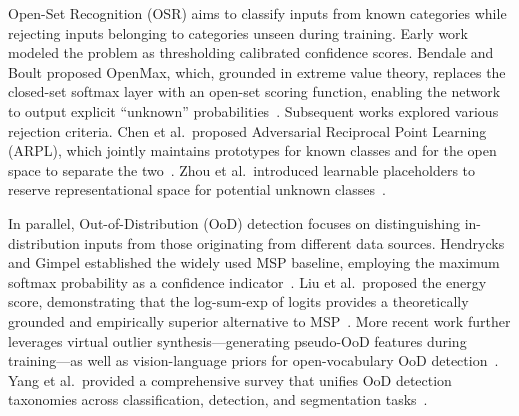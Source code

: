\documentclass[3p,twocolumn,authoryear]{elsarticle}
\begin{document}
Open-Set Recognition (OSR) aims to classify inputs from known categories while
rejecting inputs belonging to categories unseen during training.
Early work modeled the problem as thresholding calibrated confidence scores.
Bendale and Boult proposed OpenMax, which, grounded in extreme value theory,
replaces the closed-set softmax layer with an open-set scoring function, enabling
the network to output explicit ``unknown'' probabilities~\cite{bendale2016towardsopen}.
Subsequent works explored various rejection criteria.
Chen et al.\ proposed Adversarial Reciprocal Point Learning (ARPL), which jointly
maintains prototypes for known classes and for the open space to separate the
two~\cite{chen2022adversarialreciprocal}.
Zhou et al.\ introduced learnable placeholders to reserve representational space for
potential unknown classes~\cite{zhou2021learningplaceholders}.

In parallel, Out-of-Distribution (OoD) detection focuses on distinguishing in-distribution
inputs from those originating from different data sources.
Hendrycks and Gimpel established the widely used MSP baseline, employing the maximum
softmax probability as a confidence indicator~\cite{hendrycks2017baselinedetecting}.
Liu et al.\ proposed the energy score, demonstrating that the log-sum-exp of logits
provides a theoretically grounded and empirically superior alternative to
MSP~\cite{liu2020energyout}.
More recent work further leverages virtual outlier synthesis---generating pseudo-OoD
features during training---as well as vision-language priors for open-vocabulary OoD
detection~\cite{he2022ronfreliable,ming2022delvingout}.
Yang et al.\ provided a comprehensive survey that unifies OoD detection taxonomies
across classification, detection, and segmentation tasks~\cite{yang2024generalizedout}.

\end{document}
